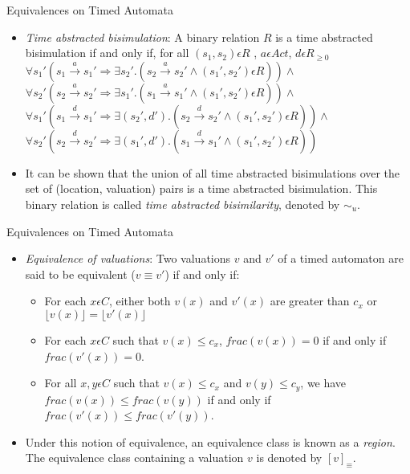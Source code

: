 \documentclass{beamer}
\begin{document}
\begin{frame}{Equivalences on Timed Automata}

  \begin{itemize}
  \item \emph{Time abstracted bisimulation}: A binary relation $R$ is
    a time abstracted
    bisimulation if and only if, for all $(s_1, s_2) \epsilon R$ , $a \epsilon Act $, $d \epsilon R_{\ge 0}$\\
    $\forall s_1' (s_1 \xrightarrow{a} s_1' \Rightarrow \exists s_2'
    . (s_2 \xrightarrow{a} s_2' \wedge (s_1', s_2') \epsilon R ) )
    \wedge $ \\
    $\forall s_2' (s_2 \xrightarrow{a} s_2' \Rightarrow \exists s_1'
    . (s_1 \xrightarrow{a} s_1' \wedge (s_1', s_2') \epsilon R ) ) \wedge $ \\
    $\forall s_1' (s_1 \xrightarrow{d} s_1' \Rightarrow \exists (s_2',
    d')
    . (s_2 \xrightarrow{d} s_2' \wedge (s_1', s_2') \epsilon R ) )
    \wedge $ \\
    $\forall s_2' (s_2 \xrightarrow{d} s_2' \Rightarrow \exists (s_1', d')
    . (s_1 \xrightarrow{d} s_1' \wedge (s_1', s_2') \epsilon R ) ) $ \\

  \item It can be shown that the union of all time abstracted bisimulations
    over the set of (location, valuation) pairs is a time abstracted
    bisimulation. This binary
    relation is called \textit{time abstracted bisimilarity}, denoted
    by $\sim_u$.
  \end{itemize}

\end{frame}

\begin{frame}{Equivalences on Timed Automata}

  \begin{itemize}

  \item \emph{Equivalence of valuations}: Two valuations $v$ and $v'$ of
    a timed automaton are said to be equivalent ($v \equiv v'$) if and
    only if:
    \begin{itemize}
    \item For each $x \epsilon C$, either both $v(x)$ and $v'(x)$ are
      greater than $c_x$ or $\lfloor v(x) \rfloor = \lfloor v'(x)
      \rfloor$
    \item For each $x \epsilon C$ such that $v(x) \le c_x$,
      $frac(v(x))=0$ if and only if $frac(v'(x))=0$.
    \item For all $x,y \epsilon C$ such that $v(x) \le c_x$ and $v(y)
      \le c_y$, we have $frac(v(x)) \le frac(v(y))$ if and only if
      $frac(v'(x)) \le frac(v'(y))$.
    \end{itemize}

  \item Under this notion of equivalence, an equivalence class is known
    as a \emph{region}. The equivalence class containing a valuation $v$
    is denoted by $[v]_{\equiv}$.

  \end{itemize}

\end{frame}
\end{document}
